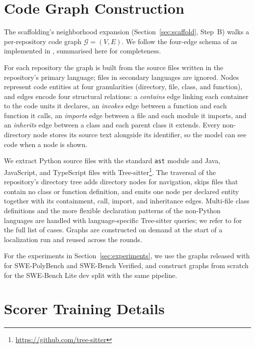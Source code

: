 \section{Code Graph Construction}
\label{app:graph}

The scaffolding's neighborhood expansion
(Section~\ref{sec:scaffold}, Step~B) walks a per-repository
code graph $\mathcal{G}{=}(V,E)$. We follow the four-edge
schema of \citet{chen2025locagent} as implemented in
\citet{chaudhari2025spider}, summarised here for completeness.

For each repository the graph is built from the source files
written in the repository's primary language; files in
secondary languages are ignored. Nodes represent code entities
at four granularities (directory, file, class, and function),
and edges encode four structural relations: a \textit{contains}
edge linking each container to the code units it declares, an
\textit{invokes} edge between a function and each function it
calls, an \textit{imports} edge between a file and each module
it imports, and an \textit{inherits} edge between a class and
each parent class it extends. Every non-directory node stores
its source text alongside its identifier, so the model can see
code when a node is shown.

We extract Python source files with the standard \texttt{ast}
module and Java, JavaScript, and TypeScript files with
Tree-sitter\footnote{\url{https://github.com/tree-sitter}}. The
traversal of the repository's directory tree adds directory
nodes for navigation, skips files that contain no class or
function definition, and emits one node per declared entity
together with its containment, call, import, and inheritance
edges. Multi-file class definitions and the more flexible
declaration patterns of the non-Python languages are handled
with language-specific Tree-sitter queries; we refer to
\citet{chaudhari2025spider} for the full list of cases. Graphs
are constructed on demand at the start of a localization run
and reused across the rounds.

For the experiments in Section~\ref{sec:experiments}, we use
the graphs released with \citet{chaudhari2025spider} for
SWE-PolyBench and SWE-Bench Verified, and construct graphs from
scratch for the SWE-Bench Lite dev split with the same
pipeline.

\section{Scorer Training Details}
\label{app:details}

